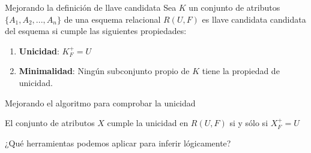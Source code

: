 \begin{frame}{Mejorando la definici\'on de llave candidata}
    Sea $K$ un conjunto de atributos $\{A_1, A_2, ..., A_n\}$ de una esquema
    relacional $R(U,F)$ es llave candidata candidata del esquema
    si cumple las siguientes propiedades:
    \begin{enumerate}
        \item \textbf{Unicidad}: $K^+_F = U$
        \item \textbf{Minimalidad}: Ning\'un subconjunto propio de $K$ tiene la propiedad de unicidad.
    \end{enumerate}
    
    
\end{frame}

\begin{frame}{Mejorando el algoritmo para comprobar la unicidad}

    El conjunto de atributos $X$ cumple la unicidad en $R(U,F)$ si y s\'olo si $X^+_F = U$ 
\end{frame}


\begin{frame}{¿Qu\'e herramientas podemos aplicar para inferir l\'ogicamente?}
\end{frame}

